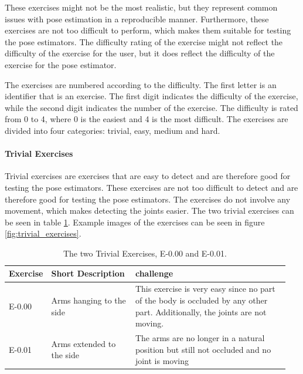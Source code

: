 These exercises might not be the most realistic, but they represent common issues with pose estimation in a reproducible manner. Furthermore, these exercises are not too difficult to perform, which makes them suitable for testing the pose estimators. The difficulty rating of the exercise might not reflect the difficulty of the exercise for the user, but it does reflect the difficulty of the exercise for the pose estimator.

The exercises are numbered according to the difficulty. The first letter is an identifier that is an exercise. The first digit indicates the difficulty of the exercise, while the second digit indicates the number of the exercise. The difficulty is rated from 0 to 4, where 0 is the easiest and 4 is the most difficult. The exercises are divided into four categories: trivial, easy, medium and hard.

\paragraph{Trivial Exercises}

Trivial exercises are exercises that are easy to detect and are therefore good for testing the pose estimators. These exercises are not too difficult to detect and are therefore good for testing the pose estimators. The exercises do not involve any movement, which makes detecting the joints easier. The two trivial exercises can be seen in table \ref{tab:trivial_exercises}. Example images of the exercises can be seen in figure \ref{fig:trivial_exercises}.

\begin{table}[]
  \caption[Trivial Exercises]{The two Trivial Exercises, E-0.00 and E-0.01.}
  \label{tab:trivial_exercises}
  \begin{tabular}{p{0.1\linewidth}p{0.3\linewidth}p{0.55\linewidth}}
  \hline
  Exercise & Short Description         & challenge   \\ \hline
  E-0.00   & Arms hanging to the side  & This exercise is very easy since no part of the body is occluded by any other part. Additionally, the joints are not moving. \\
  E-0.01   & Arms extended to the side & The arms are no longer in a natural position but still not occluded and no joint is moving \\ \hline
  \end{tabular}
\end{table} 

